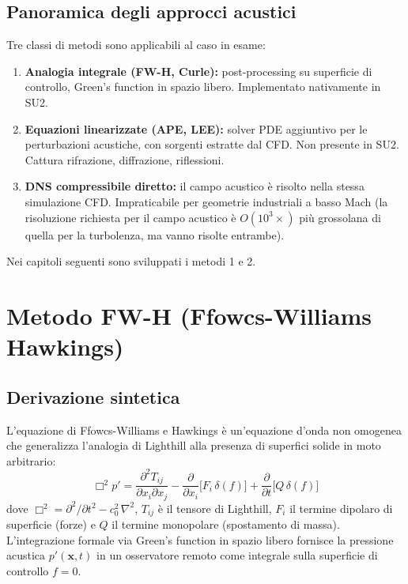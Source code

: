 \documentclass[11pt,a4paper]{article}
\begin{document}
\subsection{Panoramica degli approcci acustici}

Tre classi di metodi sono applicabili al caso in esame:

\begin{enumerate}
  \item \textbf{Analogia integrale (FW-H, Curle):} post-processing su superficie
        di controllo, Green's function in spazio libero. Implementato nativamente
        in SU2.
  \item \textbf{Equazioni linearizzate (APE, LEE):} solver PDE aggiuntivo per
        le perturbazioni acustiche, con sorgenti estratte dal CFD. Non presente
        in SU2. Cattura rifrazione, diffrazione, riflessioni.
  \item \textbf{DNS compressibile diretto:} il campo acustico è risolto nella
        stessa simulazione CFD. Impraticabile per geometrie industriali a basso
        Mach (la risoluzione richiesta per il campo acustico è $O(10^3 \times)$
        più grossolana di quella per la turbolenza, ma vanno risolte entrambe).
\end{enumerate}

Nei capitoli seguenti sono sviluppati i metodi 1 e 2.

\section{Metodo FW-H (Ffowcs-Williams Hawkings)}
\label{sec:fwh}

\subsection{Derivazione sintetica}

L'equazione di Ffowcs-Williams e Hawkings \cite{fwh1969} è un'equazione d'onda
non omogenea che generalizza l'analogia di Lighthill alla presenza di superfici
solide in moto arbitrario:
\[
  \Box^2 p' = \frac{\partial^2 T_{ij}}{\partial x_i \partial x_j}
  - \frac{\partial}{\partial x_i}\bigl[F_i\,\delta(f)\bigr]
  + \frac{\partial}{\partial t}\bigl[Q\,\delta(f)\bigr]
\]
dove $\Box^2 = \partial^2/\partial t^2 - c_0^2\,\nabla^2$, $T_{ij}$ è il
tensore di Lighthill, $F_i$ il termine dipolaro di superficie (forze) e
$Q$ il termine monopolare (spostamento di massa).
L'integrazione formale via Green's function in spazio libero fornisce la
pressione acustica $p'(\mathbf{x},t)$ in un osservatore remoto come integrale
sulla superficie di controllo $f=0$.
\end{document}
